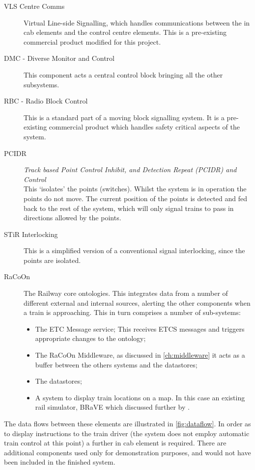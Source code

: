 \begin{description}
    \item[VLS Centre Comms] Virtual Line-side Signalling, which handles communications between the in cab elements and the control centre elements. This is a pre-existing commercial product modified for this project.
    \item[DMC - Diverse Monitor and Control] This component acts a central control block bringing all the other subsystems.
    \item[RBC - Radio Block Control] This is a standard part of a moving block signalling system.  It is a pre-existing commercial product which handles safety critical aspects of the system.
    \item[PCIDR]  \textit{Track based Point Control Inhibit, and Detection Repeat (PCIDR) and Control} \\
    This `isolates' the points (switches). Whilst the system is in operation the points do not move. The current position of the points is detected and fed back to the rest of the system, which will only signal trains to pass in directions allowed by the points.
    \item[STiR Interlocking] This is a simplified version of a conventional signal interlocking, since the points are isolated.
    \item[RaCoOn] The Railway core ontologies. This integrates data from a number of different external and internal sources, alerting the other components when a train is approaching. This in turn comprises a number of sub-systems:
    \begin{itemize}
        \item The ETC Message service; This receives ETCS messages and triggers appropriate changes to the ontology;
        \item The RaCoOn Middleware, as discussed in \autoref{ch:middleware} it acts as a buffer between the others systems and the datastores;
        \item The datastores;
        \item A system to display train locations on a map. In this case an existing rail simulator, BRaVE which discussed further by \citet{Wen2015}.
    \end{itemize}

\end{description}

The data flows between these elements are illustrated in \autoref{fig:dataflow}. In order as to display instructions to the train driver (the system does not employ automatic train control at this point) a further in cab element is required. There are additional components used only for demonstration purposes, and would not have been included in the finished system.

